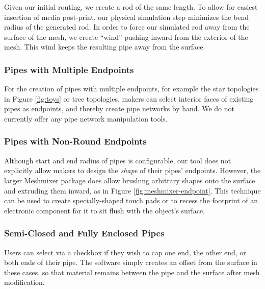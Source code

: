 Given our initial routing, we create a rod of the same length.  To allow for easiest insertion of media post-print, our physical simulation step minimizes the bend radius of the generated rod.  In order to force our simulated rod away from the surface of the mesh, we create ``wind'' pushing inward from the exterior of the mesh.  This wind keeps the resulting pipe away from the surface.  

\subsubsection{Pipes with Multiple Endpoints}
For the creation of pipes with multiple endpoints, for example the star topologies in Figure \ref{fig:toys} or tree topologies, makers can select interior faces of existing pipes as endpoints, and thereby create pipe networks by hand.  We do not currently offer any pipe network manipulation tools.


\subsubsection{Pipes with Non-Round Endpoints}
Although start and end radius of pipes is configurable, our tool does not explicitly allow makers to design the \emph{shape} of their pipes' endpoints.  However, the larger Meshmixer package does allow brushing arbitrary shapes onto the surface and extruding them inward, as in Figure \ref{fig:meshmixer-endpoint}.  This technique can be used to create specially-shaped touch pads or to recess the footprint of an electronic component for it to sit flush with the object's surface.

\subsubsection{Semi-Closed and Fully Enclosed Pipes}
Users can select via a checkbox if they wish to cap one end, the other end, or both ends of their pipe.  The software simply creates an offset from the surface in these cases, so that material remains between the pipe and the surface after mesh modification.

